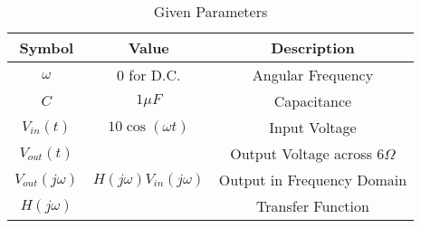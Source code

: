 \begin{table}[!h]
    \centering
    \begin{tabular}{|c|c|c|}
    \hline
       \textbf{Symbol}  &  \textbf{Value}  &  \textbf{Description}\\
    \hline
       $\omega$  &  $0$ for D.C. &  Angular Frequency\\
    \hline
        $C$ & $1\mu F$ & Capacitance \\
    \hline
        $V_{in}(t)$ & $10\cos(\omega t)$ & Input Voltage\\
    \hline
        $V_{out}(t)$ &  & Output Voltage across $6\Omega$\\
    \hline
        $V_{out}(j\omega)$ & $H(j\omega)V_{in}(j\omega)$ & Output in Frequency Domain\\
    \hline
        $H(j\omega)$ &  & Transfer Function\\
    \hline
    \end{tabular}
    \caption{Given Parameters}
    \label{tab:1_gate.22.ee.31}
\end{table}